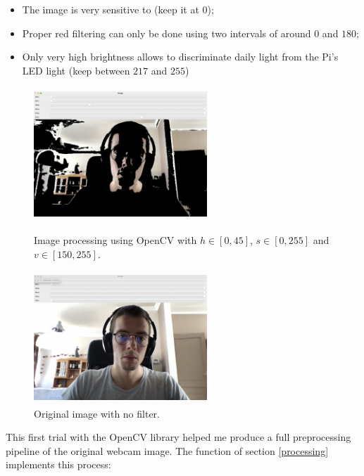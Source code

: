 \begin{itemize}
	\item The image is very sensitive to  \texttt{} (keep it at $0$);
	\item Proper red filtering can only be done using two intervals of \texttt{} around $0$ and $180$;
	\item Only very high brightness allows to discriminate daily light from the Pi's LED light (keep \texttt{} between $217$ and $255$)
\end{itemize}

\begin{figure}[H]

  \begin{minipage}[b]{0.45\linewidth}
   \centering
   \includegraphics[width=6.5cm,height=5cm]{Images/calibrate.png}
   \caption{Image processing using OpenCV with $h \in [0, 45] $,  $s \in [0, 255]$ and $v \in [150, 255]$.}
   \label{filter}
  \end{minipage}
\hfill
  \begin{minipage}[b]{0.45\linewidth}
   \centering
   \includegraphics[width=6.5cm,height=5cm]{Images/calibrate2.png}
   \caption{Original image with no filter.}
   \label{no_filter}
  \end{minipage}
\end{figure}

This first trial with the OpenCV library helped me produce a full preprocessing pipeline of the original webcam image. The function \texttt{} of section \ref{processing} implements this process:

